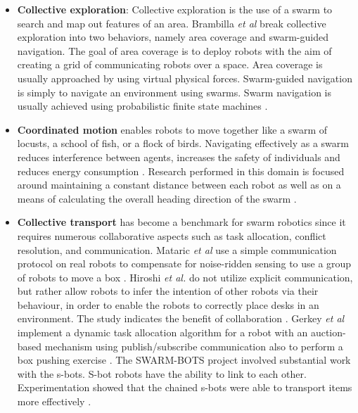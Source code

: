 \begin{itemize}
\item \textbf{Collective exploration}: Collective exploration is the use of a swarm to search and map out features of an area. Brambilla \textit{et al} \cite{brambilla2013swarm} break collective exploration into two behaviors, namely area coverage and swarm-guided navigation. The goal of area coverage is to deploy robots with the aim of creating a grid of communicating robots over a space. Area coverage is usually approached by using virtual physical forces\cite{howard2002mobile,stirling2010energy}.
Swarm-guided navigation is simply to navigate an environment using swarms. Swarm navigation is usually achieved using probabilistic finite state machines \cite{payton2001pheromone,ducatelle2011self}. 

\item \textbf{Coordinated motion} 
enables robots to move together like a swarm of locusts, a school of fish, or a flock of birds. Navigating effectively as a swarm reduces interference between agents, increases the safety of individuals and reduces energy consumption \cite{parrish2002self}. Research performed in this domain is focused around maintaining a constant distance between each robot as well as on a means of calculating the overall heading direction of the swarm \cite{turgut2008self,ferrante2010flocking,baldassarre2003evolving}.

\item \textbf{Collective transport} has become a benchmark for swarm robotics since it requires numerous collaborative aspects such as task allocation, conflict resolution, and communication. Mataric \textit{et al} use a simple communication protocol on real robots to compensate for noise-ridden sensing to use a group of robots to move a box \cite{mataric1995cooperative}. Hiroshi \textit{et al.} do not utilize explicit communication, but rather allow robots to infer the intention of other robots via their behaviour, in order to enable the robots to correctly place desks in an environment. The study indicates the benefit of collaboration \cite{sugie1995placing}. Gerkey \textit{et al} implement a dynamic task allocation algorithm for a robot with an auction-based mechanism using publish/subscribe communication also to perform a box pushing exercise \cite{gerkey2002sold}. The SWARM-BOTS project involved substantial work with the s-bots. S-bot robots have the ability to link to each other. Experimentation showed that the chained s-bots were able to transport items more effectively \cite{gross2004group, dorigo2005swarm, ferrante2013socially}.

\end{itemize}
		
